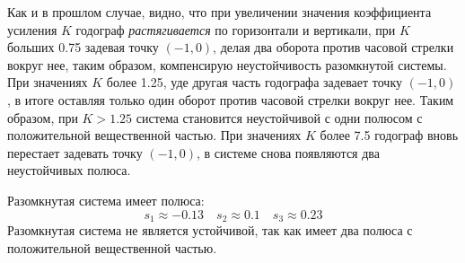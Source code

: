 Как и в прошлом случае, видно, что при увеличении значения коэффициента усиления $K$ годограф \textit{растягивается} по горизонтали и вертикали,
при $K$ больших 0.75 задевая точку $(-1, 0)$, делая два оборота против часовой стрелки вокруг нее, таким образом, компенсирую неустойчивость разомкнутой системы.
При значениях $K$ более 1.25, уде другая часть годографа задевает точку $(-1, 0)$, в итоге оставляя только один оборот против часовой стрелки вокруг нее.
Таким образом, при $K > 1.25$ система становится неустойчивой с одни полюсом с положительной вещественной частью.
При значениях $K$ более 7.5 годограф вновь перестает задевать точку $(-1, 0)$, в системе снова появляются два неустойчивых полюса. 

Разомкнутая система имеет полюса:
\begin{equation}
    s_1 \approx -0.13 \quad s_2 \approx 0.1 \quad s_3 \approx 0.23 
\end{equation}
Разомкнутая система не является устойчивой, так как имеет два полюса с положительной вещественной частью. 

